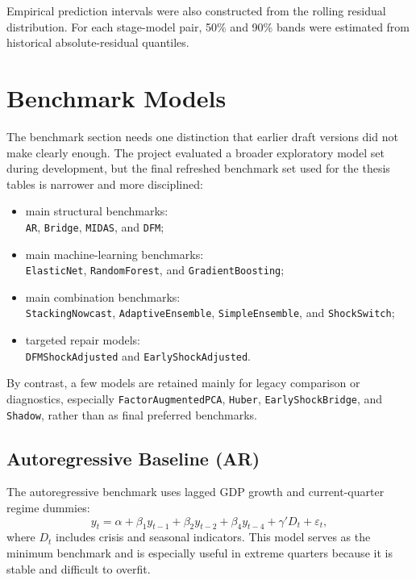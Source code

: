 \documentclass[12pt,a4paper]{report}
\begin{document}
Empirical prediction intervals were also constructed from the rolling residual distribution. For each stage-model pair, 50\% and 90\% bands were estimated from historical absolute-residual quantiles.

\section{Benchmark Models}

The benchmark section needs one distinction that earlier draft versions did not make clearly enough. The project evaluated a broader exploratory model set during development, but the final refreshed benchmark set used for the thesis tables is narrower and more disciplined:
\begin{itemize}
    \item main structural benchmarks:\\ \texttt{AR}, \texttt{Bridge}, \texttt{MIDAS}, and \texttt{DFM};
    \item main machine-learning benchmarks:\\ \texttt{ElasticNet}, \texttt{RandomForest}, and \texttt{GradientBoosting};
    \item main combination benchmarks:\\ \texttt{StackingNowcast}, \texttt{AdaptiveEnsemble}, \texttt{SimpleEnsemble}, and \texttt{ShockSwitch};
    \item targeted repair models:\\ \texttt{DFMShockAdjusted} and \texttt{EarlyShockAdjusted}.
\end{itemize}

By contrast, a few models are retained mainly for legacy comparison or diagnostics, especially \texttt{FactorAugmentedPCA}, \texttt{Huber}, \texttt{EarlyShockBridge}, and \texttt{Shadow}, rather than as final preferred benchmarks.

\subsection{Autoregressive Baseline (AR)}

The autoregressive benchmark uses lagged GDP growth and current-quarter regime dummies:
\begin{equation}
    y_t = \alpha + \beta_1 y_{t-1} + \beta_2 y_{t-2} + \beta_4 y_{t-4} + \gamma' D_t + \varepsilon_t,
\end{equation}
where $D_t$ includes crisis and seasonal indicators. This model serves as the minimum benchmark and is especially useful in extreme quarters because it is stable and difficult to overfit.
\end{document}
